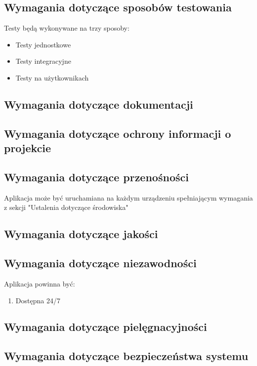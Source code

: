 \documentclass[12pt,a4paper]{report}
\begin{document}
\subsection{Wymagania dotyczące sposobów testowania}
Testy będą wykonywane na trzy sposoby:
\begin{itemize}
	\item Testy jednostkowe
	\item Testy integracyjne
	\item Testy na użytkownikach
\end{itemize}
\subsection{Wymagania dotyczące dokumentacji}
\subsection{Wymagania dotyczące ochrony informacji o projekcie}
\subsection{Wymagania dotyczące przenośności}
	Aplikacja może być uruchamiana na każdym urządzeniu spełniającym wymagania z sekcji "Ustalenia dotyczące środowiska"
\subsection{Wymagania dotyczące jakości}
\subsection{Wymagania dotyczące niezawodności}
	Aplikacja powinna być:
	\begin{enumerate}
		\item Dostępna 24/7
	\end{enumerate}	 
\subsection{Wymagania dotyczące pielęgnacyjności}
\subsection{Wymagania dotyczące bezpieczeństwa systemu}
\end{document}

